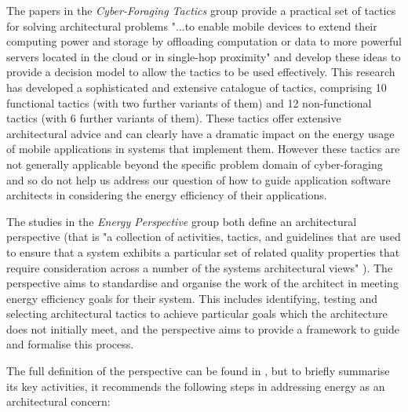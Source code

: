 The papers in the \emph{Cyber-Foraging Tactics} group provide a practical set of tactics for solving architectural problems "...to enable mobile devices to extend their computing power and storage by offloading computation or data to more powerful servers located in the cloud or in single-hop proximity" \cite{lewis2015-foragingtactics} and develop these ideas to provide a decision model to allow the tactics to be used effectively.  This research has developed a sophisticated and extensive catalogue of tactics, comprising 10 functional tactics (with two further variants of them) and 12 non-functional tactics (with 6 further variants of them).  These tactics offer extensive architectural advice and can clearly have a dramatic impact on the energy usage of mobile applications in systems that implement them.  However these tactics are not generally applicable beyond the specific problem domain of cyber-foraging and so do not help us address our question of how to guide application software architects in considering the energy efficiency of their applications.

The studies in the \emph{Energy Perspective} group both define an architectural perspective (that is "a collection of activities, tactics, and guidelines that are used to ensure that a system exhibits a particular set of related quality properties that require consideration across a number of the systems architectural views" \cite{woods2005-perspectives}).  The perspective aims to standardise and organise the work of the architect in meeting energy efficiency goals for their system.  This includes identifying, testing and selecting architectural tactics to achieve particular goals which the architecture does not initially meet, and the perspective aims to provide a framework to guide and formalise this process.

The full definition of the perspective can be found in \cite{jagroep2017-energyperspective}, but to briefly summarise its key activities, it recommends the following steps in addressing energy as an architectural concern:

